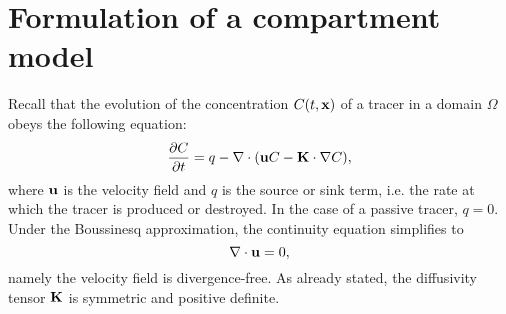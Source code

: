 \section{Formulation of a compartment model} \label{sec:fcm}
Recall that the evolution of the concentration $C(t,\mathbf x)$ of a tracer in a domain $\Omega$ obeys the following equation:
\begin{equation} \label{eq:continuousproblem}
	\frac{\partial C}{\partial t} = q - \nabla \cdot (\mathbf u C - \mathbf K \cdot \nabla C),
\end{equation}
where $\mathbf u$ is the velocity field and $q$ is the source or sink term, i.e. the rate at which the tracer is produced or destroyed. In the case of a passive tracer, $q = 0$. Under the Boussinesq approximation, the continuity equation simplifies to
\begin{equation}
	\nabla \cdot \mathbf u = 0,
\end{equation}
namely the velocity field is divergence-free. As already stated, the diffusivity tensor $\mathbf K$ is symmetric and positive definite.

